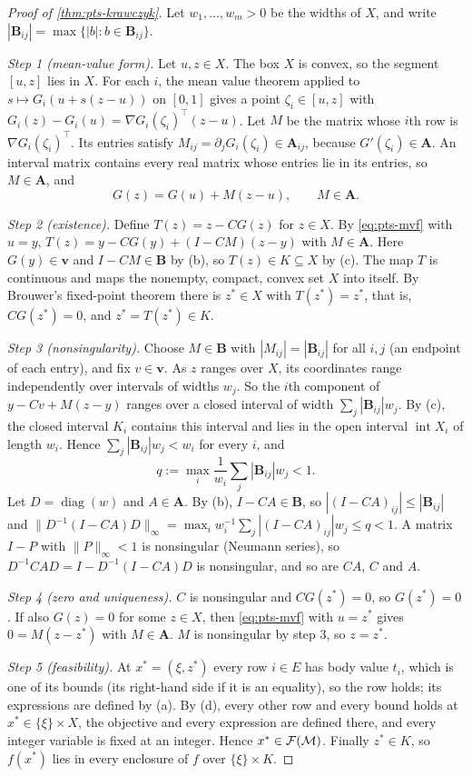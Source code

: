 \begin{proof}[Proof of \cref{thm:pts-krawczyk}]
Let $w_1,\dots,w_m>0$ be the widths of $X$, and write $|\mathbf{B}_{ij}|=\max\{|b|:b\in\mathbf{B}_{ij}\}$.

\emph{Step 1 (mean-value form).}
Let $u,z\in X$.
The box $X$ is convex, so the segment $[u,z]$ lies in $X$.
For each $i$, the mean value theorem applied to $s\mapsto G_i(u+s(z-u))$ on $[0,1]$ gives a point $\zeta_i\in[u,z]$ with $G_i(z)-G_i(u)=\nabla G_i(\zeta_i)^{\top}(z-u)$.
Let $M$ be the matrix whose $i$th row is $\nabla G_i(\zeta_i)^{\top}$.
Its entries satisfy $M_{ij}=\partial_jG_i(\zeta_i)\in\mathbf{A}_{ij}$, because $G'(\zeta_i)\in\mathbf{A}$.
An interval matrix contains every real matrix whose entries lie in its entries, so $M\in\mathbf{A}$, and
\begin{equation}\label{eq:pts-mvf}
G(z)=G(u)+M(z-u),\qquad M\in\mathbf{A}.
\end{equation}

\emph{Step 2 (existence).}
Define $T(z)=z-CG(z)$ for $z\in X$.
By \eqref{eq:pts-mvf} with $u=y$, $T(z)=y-CG(y)+(I-CM)(z-y)$ with $M\in\mathbf{A}$.
Here $G(y)\in\mathbf{v}$ and $I-CM\in\mathbf{B}$ by (b), so $T(z)\in K\subseteq X$ by (c).
The map $T$ is continuous and maps the nonempty, compact, convex set $X$ into itself.
By Brouwer's fixed-point theorem there is $z^*\in X$ with $T(z^*)=z^*$, that is, $CG(z^*)=0$, and $z^*=T(z^*)\in K$.

\emph{Step 3 (nonsingularity).}
Choose $M\in\mathbf{B}$ with $|M_{ij}|=|\mathbf{B}_{ij}|$ for all $i,j$ (an endpoint of each entry), and fix $v\in\mathbf{v}$.
As $z$ ranges over $X$, its coordinates range independently over intervals of widths $w_j$.
So the $i$th component of $y-Cv+M(z-y)$ ranges over a closed interval of width $\sum_j|\mathbf{B}_{ij}|w_j$.
By (c), the closed interval $K_i$ contains this interval and lies in the open interval $\operatorname{int}X_i$ of length $w_i$.
Hence $\sum_j|\mathbf{B}_{ij}|w_j<w_i$ for every $i$, and
\[
q:=\max_i\frac{1}{w_i}\sum_j|\mathbf{B}_{ij}|w_j<1 .
\]
Let $D=\operatorname{diag}(w)$ and $A\in\mathbf{A}$.
By (b), $I-CA\in\mathbf{B}$, so $|(I-CA)_{ij}|\le|\mathbf{B}_{ij}|$ and
$\|D^{-1}(I-CA)D\|_\infty=\max_i w_i^{-1}\sum_j|(I-CA)_{ij}|w_j\le q<1$.
A matrix $I-P$ with $\|P\|_\infty<1$ is nonsingular (Neumann series), so $D^{-1}CAD=I-D^{-1}(I-CA)D$ is nonsingular, and so are $CA$, $C$ and $A$.

\emph{Step 4 (zero and uniqueness).}
$C$ is nonsingular and $CG(z^*)=0$, so $G(z^*)=0$.
If also $G(z)=0$ for some $z\in X$, then \eqref{eq:pts-mvf} with $u=z^*$ gives $0=M(z-z^*)$ with $M\in\mathbf{A}$.
$M$ is nonsingular by step 3, so $z=z^*$.

\emph{Step 5 (feasibility).}
At $x^*=(\xi,z^*)$ every row $i\in E$ has body value $t_i$, which is one of its bounds (its right-hand side if it is an equality), so the row holds; its expressions are defined by (a).
By (d), every other row and every bound holds at $x^*\in\{\xi\}\times X$, the objective and every expression are defined there, and every integer variable is fixed at an integer.
Hence $x^*\in\mathcal{F}(\mathcal{M})$.
Finally $z^*\in K$, so $f(x^*)$ lies in every enclosure of $f$ over $\{\xi\}\times K$.
\end{proof}

